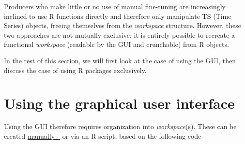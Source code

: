 \documentclass[
  letterpaper,
  DIV=11,
  numbers=noendperiod]{scrreprt}
\newenvironment{Shaded}{\begin{snugshade}}{\end{snugshade}}
\newcommand{\AttributeTok}[1]{\textcolor[rgb]{0.40,0.45,0.13}{#1}}
\newcommand{\CommentTok}[1]{\textcolor[rgb]{0.37,0.37,0.37}{#1}}
\newcommand{\DecValTok}[1]{\textcolor[rgb]{0.68,0.00,0.00}{#1}}
\newcommand{\FloatTok}[1]{\textcolor[rgb]{0.68,0.00,0.00}{#1}}
\newcommand{\FunctionTok}[1]{\textcolor[rgb]{0.28,0.35,0.67}{#1}}
\newcommand{\NormalTok}[1]{\textcolor[rgb]{0.00,0.23,0.31}{#1}}
\newcommand{\OtherTok}[1]{\textcolor[rgb]{0.00,0.23,0.31}{#1}}
\newcommand{\SpecialCharTok}[1]{\textcolor[rgb]{0.37,0.37,0.37}{#1}}
\newcommand{\StringTok}[1]{\textcolor[rgb]{0.13,0.47,0.30}{#1}}
\begin{document}
Producers who make little or no use of manual fine-tuning are
increasingly inclined to use R functions directly and therefore only
manipulate TS (Time Series) objects, freeing themselves from the
\emph{workspace} structure. However, these two approaches are not
mutually exclusive; it is entirely possible to recreate a functional
\emph{workspace} (readable by the GUI and crunchable) from R objects.

In the rest of this section, we will first look at the case of using the
GUI, then discuss the case of using R packages exclusively.

\hypertarget{using-the-graphical-user-interface}{%
\section*{Using the graphical user
interface}\label{using-the-graphical-user-interface}}


Using the GUI therefore requires organization into \emph{workspace}(s).
These can be created
\href{https://doc.jdemetra.org/t-gui-sa-modelling-features\#how-to-create-a-workspace}{manually~🔗}
or via an R script, based on the following code

\begin{Shaded}
\end{Shaded}
\end{document}
